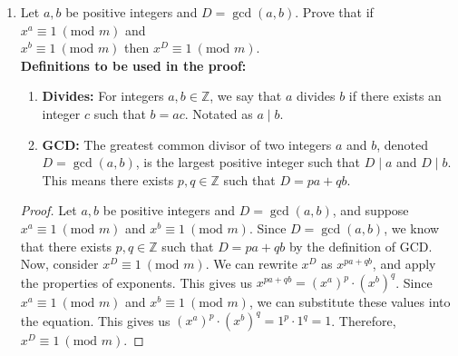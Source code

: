 \documentclass[11pt]{article}
\newcommand{\pf}[1]{
    \begin{customframedproof}
        \begin{proof}
        #1
        \end{proof}
    \end{customframedproof}
}
\newcommand{\points}[1]{\marginpar{[#1]}} %
\newcommand{\Z}{\mathbb{Z}}
\begin{document}
\vfill

\newpage



\pagestyle{standard}
\begin{enumerate}

    \item Let \(a,b\) be positive integers and \(D = \gcd(a,b)\). Prove that if \(x^a \equiv 1 \ (\text{mod } m)\) and\points{10} \\
          \(x^b \equiv 1 \ (\text{mod } m)\) then \(x^D \equiv 1 \ (\text{mod } m)\). \\

          \textbf{Definitions to be used in the proof:}
          \begin{enumerate}
              \item \textbf{Divides:} For integers \(a,b \in \Z\), we say that \(a\) divides \(b\) if there exists an integer \(c\) such that \(b = ac\). Notated as \(a \mid b\).
              \item \textbf{GCD:} The greatest common divisor of two integers \(a\) and \(b\), denoted \(D = \gcd(a,b)\), is the largest positive integer such that \(D \mid a\) and \(D \mid b\). This means there exists \(p,q \in \Z\) such that \(D = pa + qb\).
          \end{enumerate}
          \pf{
              Let \(a,b\) be positive integers and \(D = \gcd(a,b)\), and suppose \(x^a \equiv 1 \ (\text{mod } m)\) and \(x^b \equiv 1 \ (\text{mod } m)\). Since \(D = \gcd(a,b)\), we know that there exists \(p,q \in \Z\) such that \(D = pa + qb\) by the definition of GCD. Now, consider \(x^D \equiv 1 \ (\text{mod } m)\). We can rewrite \(x^D\) as \(x^{pa + qb}\), and apply the properties of exponents. This gives us \(x^{pa + qb} = (x^a)^p \cdot (x^b)^q\). Since \(x^a \equiv 1 \ (\text{mod } m)\) and \(x^b \equiv 1 \ (\text{mod } m)\), we can substitute these values into the equation. This gives us \((x^a)^p \cdot (x^b)^q = 1^p \cdot 1^q = 1\). Therefore, \(x^D \equiv 1 \ (\text{mod } m)\).
          }

          \newpage
          \pagestyle{standard}


\end{enumerate}
\end{document}
